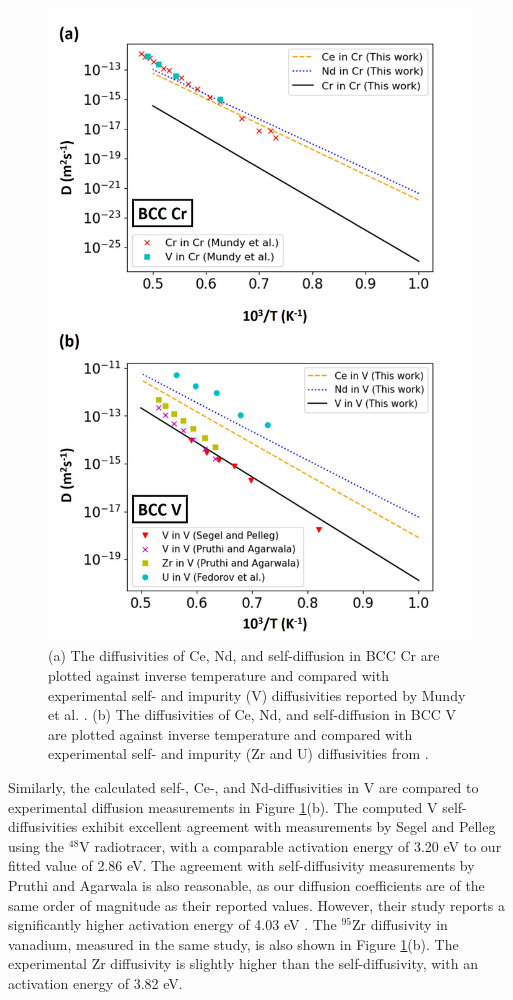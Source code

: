 \documentclass[preprint,12pt]{elsarticle}
\begin{document}
\begin{figure}[htbp]
    \centering
    \includegraphics[width=0.825\linewidth]{experiments_cr_v.jpg}
    \caption{(a) The diffusivities of Ce, Nd, and self-diffusion in BCC Cr are plotted against inverse temperature and compared with experimental self- and impurity (V) diffusivities reported by Mundy et al. \cite{mundy1976isotope}. (b) The diffusivities of Ce, Nd, and self-diffusion in BCC V are plotted against inverse temperature and compared with experimental self- and impurity (Zr and U) diffusivities from \cite{segel1997vanadium, pruthi1984solute, fedorov1971diffusion}.}
    \label{fig:diffusivities_vs_exp}
\end{figure}

Similarly, the calculated self-, Ce-, and Nd-diffusivities in V are compared to experimental diffusion measurements \cite{segel1997vanadium, pruthi1984solute, fedorov1971diffusion} in Figure
\ref{fig:diffusivities_vs_exp}(b). The computed V self-diffusivities exhibit excellent agreement with measurements by Segel and Pelleg \cite{segel1997vanadium} using the $^{48}$V radiotracer, with a comparable activation energy of 3.20 eV to our fitted value of 2.86 eV. The agreement with self-diffusivity measurements by Pruthi and Agarwala \cite{pruthi1984solute} is also reasonable, as our diffusion coefficients are of the same order of magnitude as their reported values. However, their study reports a significantly higher activation energy of 4.03 eV \cite{pruthi1984solute}. The $^{95}$Zr diffusivity in vanadium, measured in the same study, is also shown in Figure
\ref{fig:diffusivities_vs_exp}(b). The experimental Zr diffusivity is slightly higher than the self-diffusivity, with an activation energy of 3.82 eV.
\end{document}
